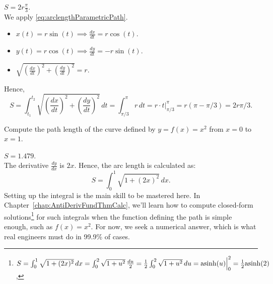 \solution \Ans $S = 2 r \frac{\pi}{3}$.\\

We apply \eqref{eq:arclengthParametricPath}. 
\begin{itemize}
    \item $x(t) = r \sin(t) \implies \frac{dx}{dt} = r \cos(t)$.
    \item $y(t) = r \cos(t) \implies \frac{dy}{dt} = -r \sin(t)$.
    \item $\sqrt{\left(\frac{dx}{dt}\right)^2 + \left(\frac{dy}{dt}\right)^2} = r$.
\end{itemize}
Hence,
$$S = \int_{t_1}^{t_2} \sqrt{\left(\frac{dx}{dt}\right)^2 + \left(\frac{dy}{dt}\right)^2} \, dt = \int_{\pi/3}^\pi r \, dt = r \cdot t \Big|_{\pi/3}^\pi = r \left( \pi - \pi/3\right)  = 2 r \pi/3.  $$




\Qed




\bigskip
\begin{example}
Compute the path length of the curve defined by \( y = f(x) = x^2 \) from \( x=0 \) to \( x=1 \). 
\end{example}

\solution \Ans $S = 1.479$.\\

The derivative \( \frac{dy}{dx} \) is \( 2x \). Hence, the arc length is calculated as:
\begin{equation}
S = \int_{0}^{1} \sqrt{1 + (2x)^2} \, dx.
\end{equation}
Setting up the integral is the main skill to be mastered here. In Chapter~\ref{chap:AntiDerivFundThmCalc}, we'll learn how to compute closed-form solutions\footnote{$S = \int_{0}^{1} \sqrt{1 + (2x)^2} \, dx =  \int_{0}^{2} \sqrt{1 + u^2} \, \frac{du}{2} = \frac{1}{2} \int_{0}^{2} \sqrt{1 + u^2} \, du = \mathrm{asinh}(u) \Big|_0^2 =  \frac{1}{2} \mathrm{asinh}(2)$,} for such integrals when the function defining the path is simple enough, such as $f(x) = x^2$. For now, we seek a numerical answer, which is what real engineers must do in 99.9\% of cases.

\bigskip

